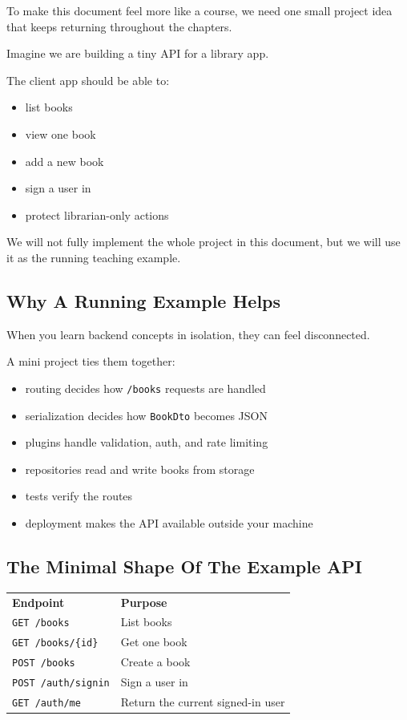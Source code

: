 \documentclass[11pt,a4paper]{article}
\begin{document}
To make this document feel more like a course, we need one small project idea that keeps returning throughout the chapters.

Imagine we are building a tiny API for a library app.

The client app should be able to:
\begin{itemize}
    \item list books
    \item view one book
    \item add a new book
    \item sign a user in
    \item protect librarian-only actions
\end{itemize}

We will not fully implement the whole project in this document, but we will use it as the running teaching example.

\subsection{Why A Running Example Helps}

When you learn backend concepts in isolation, they can feel disconnected.

A mini project ties them together:
\begin{itemize}
    \item routing decides how \texttt{/books} requests are handled
    \item serialization decides how \texttt{BookDto} becomes JSON
    \item plugins handle validation, auth, and rate limiting
    \item repositories read and write books from storage
    \item tests verify the routes
    \item deployment makes the API available outside your machine
\end{itemize}

\subsection{The Minimal Shape Of The Example API}

\begin{longtable}{p{} p{}}
\textbf{Endpoint} & \textbf{Purpose} \\
\texttt{GET /books} & List books \\
\texttt{GET /books/\{id\}} & Get one book \\
\texttt{POST /books} & Create a book \\
\texttt{POST /auth/signin} & Sign a user in \\
\texttt{GET /auth/me} & Return the current signed-in user \\
\end{longtable}
\end{document}
